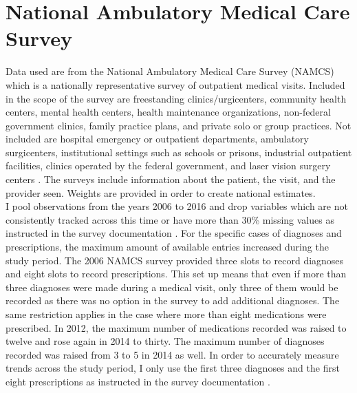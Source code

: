 \section{National Ambulatory Medical Care Survey}
Data used are from the National Ambulatory Medical Care Survey (NAMCS) which is a nationally representative survey of outpatient medical visits. Included in the scope of the survey are freestanding clinics/urgicenters, community health centers, mental health centers, health maintenance organizations,  non-federal government clinics, family practice plans, and private solo or group practices. Not included are hospital emergency or outpatient departments, ambulatory surgicenters, institutional settings such as schools or prisons, industrial outpatient facilities, clinics operated by the federal government, and laser vision surgery centers \cite{hing_basic_nodate}. The surveys include information about the patient, the visit, and the provider seen. Weights are provided in order to create national estimates.\\
\indent I pool observations from the years 2006 to 2016 and drop variables which are not consistently tracked across this time or have more than 30\% missing values as instructed in the survey documentation \cite{myrick_understanding_nodate}. For the specific cases of diagnoses and prescriptions, the maximum amount of available entries increased during the study period. The 2006 NAMCS survey provided three slots to record diagnoses and eight slots to record prescriptions. This set up means that even if more than three diagnoses were made during a medical visit, only three of them would be recorded as there was no option in the survey to add additional diagnoses. The same restriction applies in the case where more than eight medications were prescribed. In 2012, the maximum number of medications recorded was raised to twelve and rose again in 2014 to thirty. The maximum number of diagnoses recorded was raised from 3 to 5 in 2014 as well. In order to accurately measure trends across the study period, I only use the first three diagnoses and the first eight prescriptions as instructed in the survey documentation \cite{schappert_analyzing_nodate}.\\
